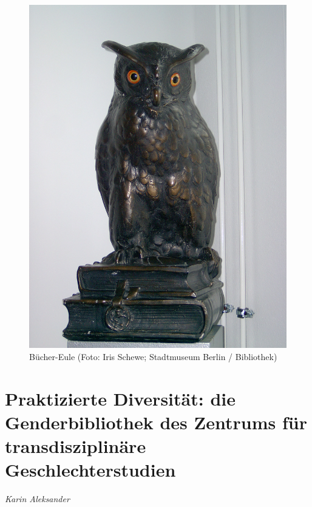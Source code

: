 \documentclass[a4paper,
fontsize=11pt,
oneside,
numbers=noperiodatend,
parskip=half-,
bibliography=totoc,
final
]{scrartcl}
\begin{document}
\begin{figure}
\centering
\includegraphics{img/Schewe_3.jpg}
\caption{Bücher-Eule (Foto: Iris Schewe; Stadtmuseum Berlin /
Bibliothek)}
\end{figure}

\hypertarget{praktizierte-diversituxe4t-die-genderbibliothek-des-zentrums-fuxfcr-transdisziplinuxe4re-geschlechterstudien}{%
\section*{Praktizierte Diversität: die Genderbibliothek des
Zentrums für transdisziplinäre
Geschlechterstudien}\label{praktizierte-diversituxe4t-die-genderbibliothek-des-zentrums-fuxfcr-transdisziplinuxe4re-geschlechterstudien}}

\emph{Karin Aleksander}
\end{document}
